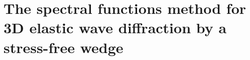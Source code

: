 \chapter[][3D Elastic Case]{The spectral functions method for 3D elastic wave diffraction by a stress-free wedge}
\label{chap-3D}